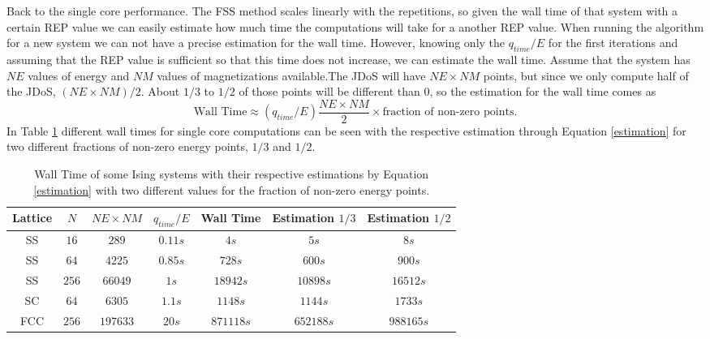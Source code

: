 Back to the single core performance. The FSS method scales linearly with the repetitions, so given the wall time of that system with a certain REP value we can easily estimate how much time the computations will take for a another REP value.
When running the algorithm for a new system we can not have a precise estimation for the wall time. However, knowing only the $q_{time}/E$ for the first iterations and assuming that the REP value is sufficient so that this time does not increase, we can estimate the wall time. Assume that the system has $NE$ values of energy and $NM$ values of magnetizations available.The JDoS will have $NE \times NM$ points, but since we only compute half of the JDoS, $( NE \times NM ) / 2$. About $1/3$ to $1/2$ of those points will be different than 0, so the estimation for the wall time comes as 
\begin{equation}\label{estimation}
	\text{Wall Time} \approx (q_{time}/E) \frac{NE \times NM}{2} \times \text{fraction of non-zero points} .
\end{equation}
In Table \ref{wall_time_table} different wall times for single core computations can be seen with the respective estimation through Equation \ref{estimation} for two different fractions of non-zero energy points, $1/3$ and $1/2$. 

\begin{table}[h]
\centering
\caption{Wall Time of some Ising systems with their respective estimations by Equation \ref{estimation} with two different values for the fraction of non-zero energy points.} 
\begin{tabular}{c|c|c|c|c|c|c}
Lattice & $N$   & $NE \times NM$ & $q_{time}/E$ & Wall Time & Estimation $1/3$ & Estimation $1/2$ \\ \hline
SS      & $16$  & $289$                         & $0.11s $        & $4s$        &$ 5s$                  & $8s$                  \\
SS      & $64$  & $4225$                        & $0.85s$         & $728s$      & $600s $               & $900s    $ \\
SS      & $256$ & $66049$                       & $1s$            & $18942s$    & $10898s $             & $16512s  $ \\
SC      & $64$  & $6305$                        & $1.1s $         & $1148s$     & $1144s$              & $1733s $           \\
FCC     & $256$ & $197633$                      & $20s$           &$ 871118s$   & $652188s$      & $988165s$            
\end{tabular}
\label{wall_time_table}
\end{table}


